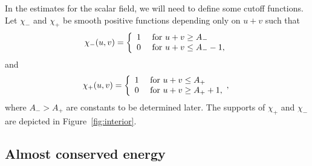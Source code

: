 \documentclass[10pt, reqno]{amsart}
\theoremstyle{definition}
\theoremstyle{remark}
\numberwithin{equation}{section}
\newcommand{\0}{\emptyset}
\begin{document}
In the estimates for the scalar field, we will need to define some cutoff functions. Let $\chi_{-}$ and $\chi_{+}$ be smooth positive functions depending only on $u+v$ such that
\begin{equation}\label{chi1.def}
	\chi_{-}(u,v) = 
	\left\{
\begin{array}{cl}	
	1 & \hbox{ for } u+v\geq A_- \\
	0 & \hbox{ for } u+v\leq A_- -1,
\end{array} \right.
\end{equation}
and
\begin{equation}\label{chi2.def}
	\chi_{+}(u,v) = 
	\left\{
\begin{array}{cl}	
	1 & \hbox{ for } u+v\leq A_+ \\
	0 & \hbox{ for } u+v \geq A_+ +1,
\end{array}, \right.
\end{equation}
where $A_- >A_+$ are constants to be determined later. The supports of $\chi_{+}$ and $\chi_{-}$ are depicted in Figure~\ref{fig:interior}.

\subsection{Almost conserved energy}\label{sec.almost.energy}
\end{document}
